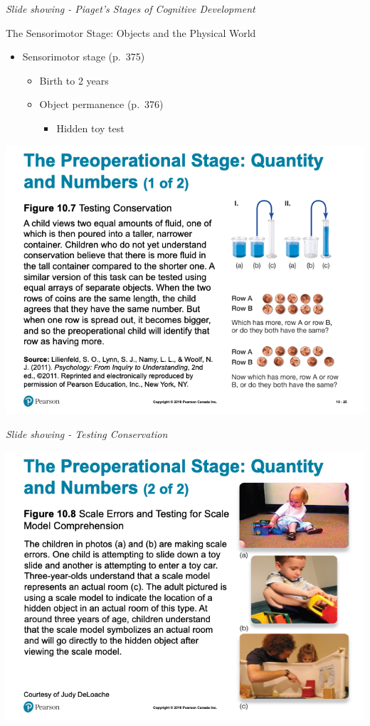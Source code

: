 \documentclass[
]{book}
\providecommand{\tightlist}{%
  \setlength{\itemsep}{0pt}\setlength{\parskip}{0pt}}
\begin{document}
\begin{reflect}
\emph{Slide showing - Piaget's Stages of Cognitive Development}

The Sensorimotor Stage: Objects and the Physical World

\begin{itemize}
\tightlist
\item
  Sensorimotor stage (p.~375)

  \begin{itemize}
  \tightlist
  \item
    Birth to 2 years\\
  \item
    Object permanence (p.~376)

    \begin{itemize}
    \tightlist
    \item
      Hidden toy test
    \end{itemize}
  \end{itemize}
\end{itemize}

\includegraphics{assets/unit_3/slide_25.png}

\emph{Slide showing - Testing Conservation}

\includegraphics{assets/unit_3/slide_26.png}


\end{reflect}
\end{document}
